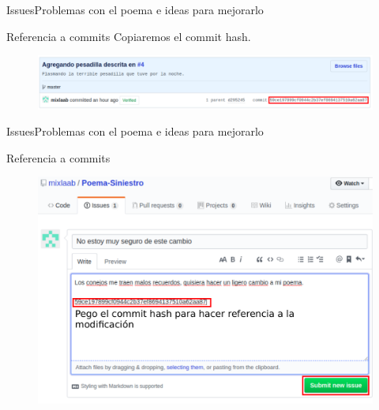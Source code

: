 \documentclass[10pt]{beamer}
\begin{document}
\begin{frame}{Issues}{Problemas con el poema e ideas para mejorarlo}

\begin{block}{Referencia a commits}
Copiaremos el commit hash.
\vspace{0.1in}
\begin{figure}[h!]
\centering
\includegraphics [scale=0.35]{commithash}
\label{fig:first}
\end{figure}
    
\end{block}

\end{frame}

\begin{frame}{Issues}{Problemas con el poema e ideas para mejorarlo}

\begin{block}{Referencia a commits}
\vspace{0.1in}
\begin{figure}[h!]
\centering
\includegraphics [scale=0.35]{commitreference}
\label{fig:first}
\end{figure}
    
\end{block}

\end{frame}
\end{document}
